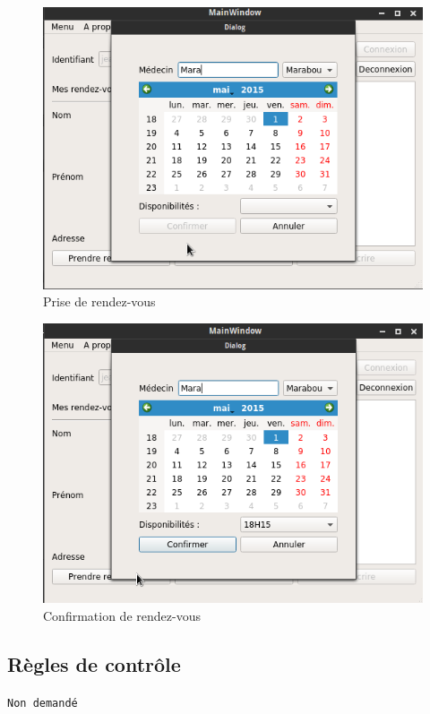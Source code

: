 \documentclass[a4paper, 11pt]{report}
\begin{document}
\begin{figure}[hb]
	\centering
	\includegraphics[scale=0.4]{GUI/rdv.png}
	\caption{Prise de rendez-vous}
	\label{fig:rdv}
\end{figure}
\begin{figure}[hb]
	\centering
	\includegraphics[scale=0.4]{GUI/rdvConfirm.png}
	\caption{Confirmation de rendez-vous}
	\label{fig:rdvConfirm}
\end{figure}
\newpage
\subsection{Règles de contrôle}
\texttt{Non demandé}
\newpage
\end{document}
